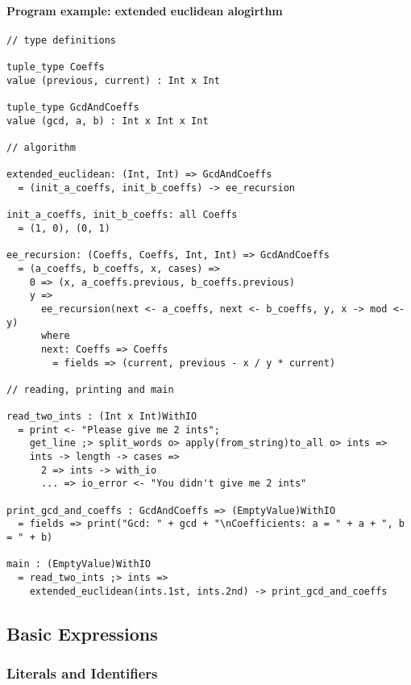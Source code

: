 \documentclass{article}
\begin{document}
\paragraph{Program example: extended euclidean alogirthm}
\begin{verbatim}
// type definitions

tuple_type Coeffs
value (previous, current) : Int x Int

tuple_type GcdAndCoeffs
value (gcd, a, b) : Int x Int x Int

// algorithm

extended_euclidean: (Int, Int) => GcdAndCoeffs
  = (init_a_coeffs, init_b_coeffs) -> ee_recursion

init_a_coeffs, init_b_coeffs: all Coeffs
  = (1, 0), (0, 1)

ee_recursion: (Coeffs, Coeffs, Int, Int) => GcdAndCoeffs
  = (a_coeffs, b_coeffs, x, cases) =>
    0 => (x, a_coeffs.previous, b_coeffs.previous)
    y =>
      ee_recursion(next <- a_coeffs, next <- b_coeffs, y, x -> mod <- y)
      where
      next: Coeffs => Coeffs
        = fields => (current, previous - x / y * current)

// reading, printing and main

read_two_ints : (Int x Int)WithIO
  = print <- "Please give me 2 ints";
    get_line ;> split_words o> apply(from_string)to_all o> ints =>
    ints -> length -> cases =>
      2 => ints -> with_io
      ... => io_error <- "You didn't give me 2 ints"
 
print_gcd_and_coeffs : GcdAndCoeffs => (EmptyValue)WithIO
  = fields => print("Gcd: " + gcd + "\nCoefficients: a = " + a + ", b = " + b)

main : (EmptyValue)WithIO
  = read_two_ints ;> ints =>
    extended_euclidean(ints.1st, ints.2nd) -> print_gcd_and_coeffs
\end{verbatim}

\subsection{Basic Expressions}

\subsubsection{Literals and Identifiers}
\end{document}
